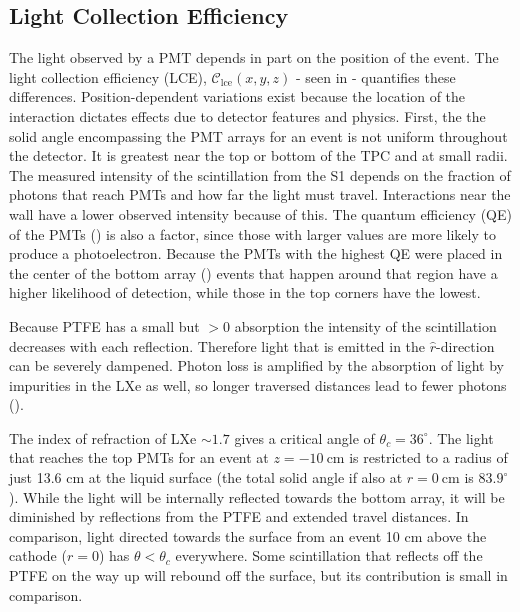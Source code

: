 \subsection{Light Collection Efficiency}
\label{subsec:det_char_lce}
The light observed by a PMT depends in part on the position of the event.  The light collection efficiency (LCE),
$\mathcal{C}_{\mathrm{lce}}(x, y, z)$ - seen in  - quantifies these differences.  Position-dependent
variations exist because the location of
the interaction dictates effects due to detector features and physics.  First, the the solid angle encompassing the PMT arrays
for an event is not uniform
throughout the detector.  It is greatest near the top or bottom of the TPC and at small radii.  The measured intensity of the
scintillation
from the S1 depends on the fraction of photons that reach PMTs and how far the light must travel.  Interactions near the
wall have a lower observed intensity because of this.  The quantum efficiency (QE) of the PMTs () is also a
factor, since those with larger values are more likely to produce a photoelectron.  Because the PMTs with the highest QE were placed in
the
center of the bottom array () events that happen around that region have a higher likelihood of detection,
while those in the top corners have the lowest.

Because PTFE has a small but $> 0$ absorption the intensity of the scintillation decreases with each reflection.  Therefore light
that is emitted in the $\hat{r}$-direction can be severely dampened.  Photon loss is amplified by the absorption of light by
impurities in the LXe as well, so longer traversed distances lead to fewer photons ().

The index of refraction of LXe ${\sim} 1.7$
gives a critical angle of $\theta_c = 36^{\circ}$.  The light that reaches the top PMTs for an event at
$z = -10\ \mathrm{cm}$ is restricted to a radius of just 13.6 cm at the liquid surface (the total solid angle if also at
$r = 0\ \mathrm{cm}$ is $83.9^{\circ}$).  While the light will be internally reflected towards the bottom array, it will
be diminished by reflections from the PTFE and extended travel distances. In comparison, light
directed towards the surface from an event 10 cm above the cathode ($r = 0$)
has $\theta < \theta_c$ everywhere.  Some scintillation that reflects off the PTFE on the way up will rebound off the surface, but its
contribution is small in comparison.

